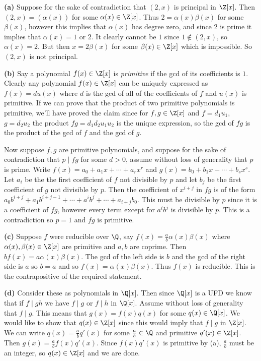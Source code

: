 \documentclass[11pt,letterpaper]{article}
\begin{document}
\begin{solution}
    \textbf{(a)} Suppose for the sake of contradiction that $(2,x)$ is principal in $\Z[x]$. Then $(2,x)=(\alpha(x))$ for some $\alpha(x)\in \Z[x]$. Thus $2=\alpha(x)\beta(x)$ for some $\beta(x)$, however this implies that $\alpha(x)$ has degree zero, and since $2$ is prime it implies that $\alpha(x)=1$ or $2$. It clearly cannot be $1$ since $1\not\in (2,x)$, so $\alpha(x)=2$. But then $x=2\beta(x)$ for some $\beta(x)\in\Z[x]$ which is impossible. So $(2,x)$ is not principal.    
    
    \textbf{(b)} Say a polynomial $f(x)\in \Z[x]$ is \emph{primitive} if the gcd of its coefficients is $1$. Clearly any polynomial $f(x)\in \Z[x]$ can be uniquely expressed as $f(x)=du(x)$ where $d$ is the gcd of all of the coefficients of $f$ and $u(x)$ is primitive. If we can prove that the product of two primitive polynomials is primitive, we'll have proved the claim since for $f,g\in \Z[x]$ and $f=d_1u_1$, $g=d_2u_2$ the product $fg=d_1d_2u_1u_2$ is the unique expression, so the gcd of $fg$ is the product of the gcd of $f$ and the gcd of $g$.
    
    Now suppose $f,g$ are primitive polynomials, and suppose for the sake of contradiction that $p\mid fg$ for some $d>0$, assume without loss of generality that $p$ is prime. Write $f(x)=a_0+a_1x+\cdots+a_rx^r$ and $g(x)=b_0+b_1x+\cdots+b_sx^s$. Let $a_i$ be the the first coefficient of $f$ not divisible by $p$ and let $b_j$ be the first coefficient of $g$ not divisible by $p$. Then the coefficient of $x^{i+j}$ in $fg$ is of the form $a_0b^{i+j}+a_1b^{i+j-1}+\cdots+a^ib^j+\cdots+a_{i+j}b_0$. This must be divisible by $p$ since it is a coefficient of $fg$, however every term except for $a^ib^j$ is divisible by $p$. This is a contradiction so $p=1$ and $fg$ is primitive.
    
    \textbf{(c)} Suppose $f$ were reducible over $\Q$, say $f(x)=\frac{a}{b}\alpha(x)\beta(x)$ where $\alpha(x),\beta(x)\in \Z[x]$ are primitive and $a,b$ are coprime. Then $b f(x)=a\alpha(x)\beta(x)$. The gcd of the left side is $b$ and the gcd of the right side is $a$ so $b=a$ and so $f(x)=\alpha(x)\beta(x)$. Thus $f(x)$ is reducible. This is the contrapositive of the required statement. 
    
    \textbf{(d)} Consider these as polynomials in $\Q[x]$. Then since $\Q[x]$ is a UFD we know that if $f\mid gh$ we have $f\mid g$ or $f\mid h$ in $\Q[x]$. Assume without loss of generality that $f\mid g$. This means that $g(x)=f(x)q(x)$ for some $q(x)\in \Q[x]$. We would like to show that $q(x)\in \Z[x]$ since this would imply that $f\mid g$ in $\Z[x]$. We can write $q(x)=\frac{a}{b}q'(x)$ for some $\frac{a}{b}\in \Q$ and primitive $q'(x)\in \Z[x]$. Then $g(x)=\frac{a}{b}f(x)q'(x)$. Since $f(x)q'(x)$ is primitive by (a), $\frac{a}{b}$ must be an integer, so $q(x)\in \Z[x]$ and we are done.   
    

\end{solution}
\end{document}
